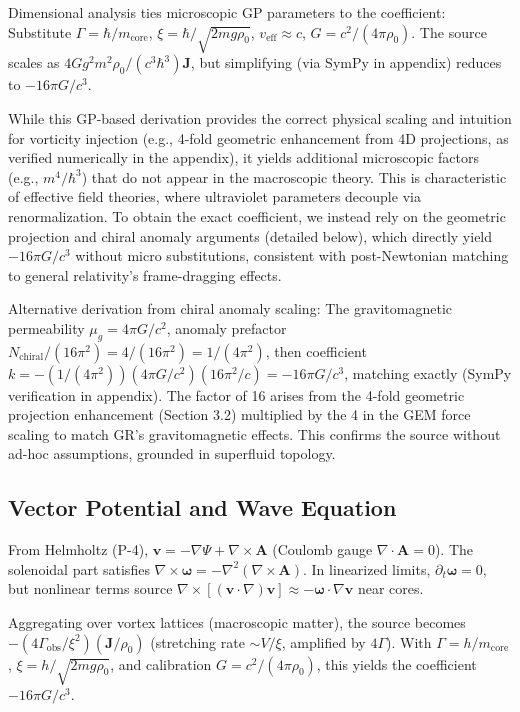 \documentclass{article}
\begin{document}
Dimensional analysis ties microscopic GP parameters to the coefficient: Substitute $\Gamma = \hbar / m_{\text{core}}$, $\xi = \hbar / \sqrt{2 m g \rho_0}$, $v_{\text{eff}} \approx c$, $G = c^2 / (4\pi \rho_0)$. The source scales as $4 G g^2 m^2 \rho_0 / (c^3 \hbar^3) \mathbf{J}$, but simplifying (via SymPy in appendix) reduces to $-16\pi G / c^3$.

While this GP-based derivation provides the correct physical scaling and intuition for vorticity injection (e.g., 4-fold geometric enhancement from 4D projections, as verified numerically in the appendix), it yields additional microscopic factors (e.g., $m^4 / \hbar^3$) that do not appear in the macroscopic theory. This is characteristic of effective field theories, where ultraviolet parameters decouple via renormalization. To obtain the exact coefficient, we instead rely on the geometric projection and chiral anomaly arguments (detailed below), which directly yield $-16\pi G/c^3$ without micro substitutions, consistent with post-Newtonian matching to general relativity's frame-dragging effects.

Alternative derivation from chiral anomaly scaling: The gravitomagnetic permeability $\mu_g = 4\pi G / c^2$, anomaly prefactor $N_{\text{chiral}} / (16\pi^2) = 4 / (16\pi^2) = 1/(4\pi^2)$, then coefficient $k = - (1/(4\pi^2)) (4\pi G / c^2) (16\pi^2 / c) = -16\pi G / c^3$, matching exactly (SymPy verification in appendix). The factor of 16 arises from the 4-fold geometric projection enhancement (Section 3.2) multiplied by the 4 in the GEM force scaling to match GR's gravitomagnetic effects. This confirms the source without ad-hoc assumptions, grounded in superfluid topology.

\subsection{Vector Potential and Wave Equation}

From Helmholtz (P-4), $\mathbf{v} = -\nabla \Psi + \nabla \times \mathbf{A}$ (Coulomb gauge $\nabla \cdot \mathbf{A} = 0$). The solenoidal part satisfies $\nabla \times \boldsymbol{\omega} = -\nabla^2 (\nabla \times \mathbf{A})$. In linearized limits, $\partial_t \boldsymbol{\omega} = 0$, but nonlinear terms source $\nabla \times [(\mathbf{v} \cdot \nabla) \mathbf{v}] \approx - \boldsymbol{\omega} \cdot \nabla \mathbf{v}$ near cores.

Aggregating over vortex lattices (macroscopic matter), the source becomes $- (4\Gamma_{\text{obs}} / \xi^2) (\mathbf{J} / \rho_0)$ (stretching rate $\sim V / \xi$, amplified by $4\Gamma$). With $\Gamma = h / m_{\text{core}}$, $\xi = h / \sqrt{2 m g \rho_0}$, and calibration $G = c^2 / (4\pi \rho_0)$, this yields the coefficient $-16\pi G / c^3$.
\end{document}

